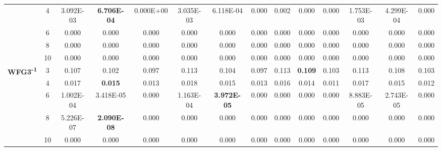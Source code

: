 \documentclass[onecolumn,10pt]{asme2ej}
\begin{document}
\begin{table}[!htb]
\begin{tabular}{|c|c|c|c|c|c|c|c|c|c|c|c|c|c|}
	& 4          & 3.092E-03     & \textbf{6.706E-04} & 0.000E+00      & 3.035E-03     & 6.118E-04          & 0.000          & 0.002         & 0.000              & 0.000          & 1.753E-03     & 4.299E-04          & 0.000          \\ \cline{2-14} 
	& 6          & 0.000         & 0.000              & 0.000          & 0.000         & 0.000              & 0.000          & 0.000         & 0.000              & 0.000          & 0.000         & 0.000              & 0.000          \\ \cline{2-14} 
	& 8          & 0.000         & 0.000              & 0.000          & 0.000         & 0.000              & 0.000          & 0.000         & 0.000              & 0.000          & 0.000         & 0.000              & 0.000          \\ \cline{2-14} 
	& 10         & 0.000         & 0.000              & 0.000          & 0.000         & 0.000              & 0.000          & 0.000         & 0.000              & 0.000          & 0.000         & 0.000              & 0.000          \\ \hline
	\multirow{5}{*}{\textbf{WFG3\textsuperscript{-1}}} & 3          & 0.107         & 0.102              & 0.097          & 0.113         & 0.104              & 0.097          & 0.113         & \textbf{0.109}     & 0.103          & 0.113         & 0.108              & 0.103          \\ \cline{2-14} 
	& 4          & 0.017         & \textbf{0.015}     & 0.013          & 0.018         & 0.015              & 0.013          & 0.016         & 0.014              & 0.011          & 0.017         & 0.015              & 0.012          \\ \cline{2-14} 
	& 6          & 1.002E-04     & 3.418E-05          & 0.000          & 1.163E-04     & \textbf{3.972E-05} & 0.000          & 0.000         & 0.000              & 0.000          & 8.883E-05     & 2.743E-05          & 0.000          \\ \cline{2-14} 
	& 8          & 5.226E-07     & \textbf{2.090E-08} & 0.000          & 0.000         & 0.000              & 0.000          & 0.000         & 0.000              & 0.000          & 0.000         & 0.000              & 0.000          \\ \cline{2-14} 
	& 10         & 0.000         & 0.000              & 0.000          & 0.000         & 0.000              & 0.000          & 0.000         & 0.000              & 0.000          & 0.000         & 0.000              & 0.000          \\ \hline

\end{tabular}
\end{table}
\end{document}
